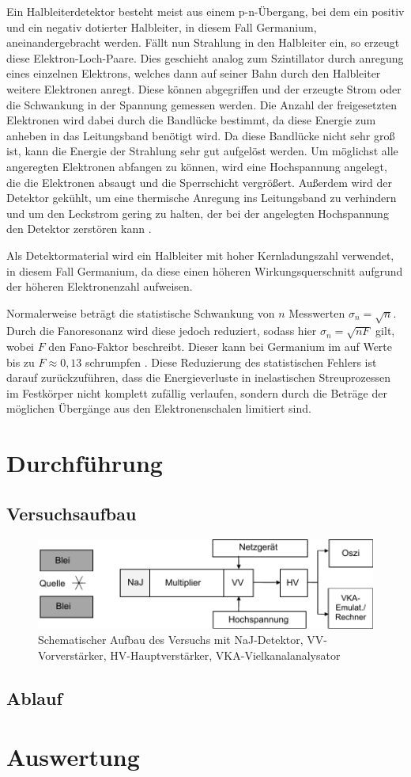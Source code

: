 \documentclass[
	parskip=half,10pt,
	numbers= noenddot, %
	toc=flat, %
	oneside,
	twocolumn,
	]{scrartcl}
\begin{document}
Ein Halbleiterdetektor besteht meist aus einem p-n-Übergang, bei dem ein positiv und ein negativ dotierter Halbleiter, in diesem Fall Germanium, aneinandergebracht werden. 
Fällt nun Strahlung in den Halbleiter ein, so erzeugt diese Elektron-Loch-Paare. Dies geschieht analog zum Szintillator durch anregung eines einzelnen Elektrons, 
welches dann auf seiner Bahn durch den Halbleiter weitere Elektronen anregt. Diese können abgegriffen und der erzeugte Strom oder die Schwankung in der Spannung gemessen 
werden. Die Anzahl der freigesetzten Elektronen wird dabei durch die Bandlücke bestimmt, da diese Energie zum anheben in das Leitungsband benötigt wird. Da diese 
Bandlücke nicht sehr groß ist, kann die Energie der Strahlung sehr gut aufgelöst werden. Um möglichst alle angeregten 
Elektronen abfangen zu können, wird eine Hochspannung angelegt, die die Elektronen absaugt und die Sperrschicht vergrößert. Außerdem wird der Detektor gekühlt, um 
eine thermische Anregung ins Leitungsband zu verhindern und um den Leckstrom gering zu halten, der bei der angelegten Hochspannung den Detektor zerstören kann 
\cite{nicoletti}. 

Als Detektormaterial wird ein Halbleiter mit hoher Kernladungszahl verwendet, in diesem Fall Germanium, da diese einen höheren Wirkungsquerschnitt aufgrund der höheren 
Elektronenzahl aufweisen.

Normalerweise beträgt die statistische Schwankung von $n$ Messwerten $\sigma_n = \sqrt{n}$. Durch die Fanoresonanz wird diese jedoch reduziert, sodass hier 
$\sigma_n = \sqrt{n F}$ gilt, wobei $F$ den Fano-Faktor beschreibt. Dieser kann bei Germanium im auf Werte bis zu $F \approx 0,13$ schrumpfen \cite{fano}. 
Diese Reduzierung des statistischen Fehlers ist darauf zurückzuführen, dass die Energieverluste in inelastischen Streuprozessen im Festkörper nicht komplett zufällig 
verlaufen, sondern durch die Beträge der möglichen Übergänge aus den Elektronenschalen limitiert sind.

\section{Durchführung}

\subsection{Versuchsaufbau}

\begin{figure}[h]
\centering
\includegraphics[width=.8\textwidth]{images/aufbau.pdf}
\caption{Schematischer Aufbau des Versuchs \cite{wiki} mit NaJ-Detektor, VV-Vorverstärker, HV-Hauptverstärker, VKA-Vielkanalanalysator}
\label{fig:aufbau}
\end{figure}

\subsection{Ablauf}

\section{Auswertung}


\newpage


\end{document}
